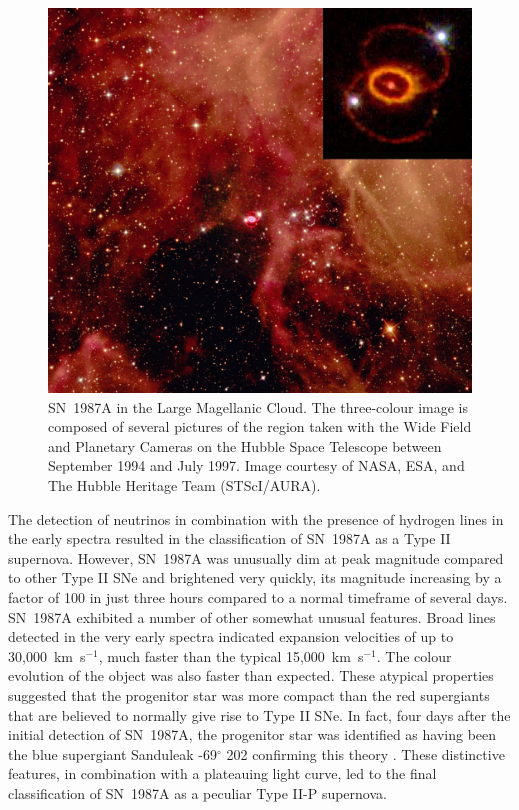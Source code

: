 \begin{figure}
\centering
\includegraphics[clip=true,scale=0.4,trim= 20 80 20 40]{chapters/chapter5/images/87A_image.jpg}
\caption{SN~1987A in the Large Magellanic Cloud.  The three-colour image is composed of several pictures of the region taken with the Wide Field and Planetary Cameras on the Hubble Space Telescope between September 1994 and July 1997.  Image courtesy of NASA, ESA, and The Hubble Heritage Team (STScI/AURA).}
\label{87A_img}
\end{figure}

The detection of neutrinos in combination with the presence of hydrogen lines in the early spectra resulted in the classification of SN~1987A as a Type II supernova.  However, SN~1987A was unusually dim at peak magnitude compared to other Type II SNe and brightened very quickly, its magnitude increasing by a factor of 100 in just three hours compared to a normal timeframe of several days.  SN~1987A exhibited a number of other somewhat unusual features. Broad lines detected in the very early spectra indicated expansion velocities of up to 30,000~km~s$^{-1}$, much faster than the typical 15,000~km~s$^{-1}$. The colour evolution of the object was also faster than  expected.  These atypical properties suggested that the progenitor star was more compact than the red supergiants that are believed to normally give rise to Type II SNe.  In fact, four days after the initial detection of SN~1987A, the progenitor star was identified as having been the blue supergiant Sanduleak -69$^{\circ}$ 202  confirming this theory \citep{Sonneborn1987}.  These distinctive features, in combination with a plateauing light curve, led to the final classification of SN~1987A as a peculiar Type II-P supernova. 


